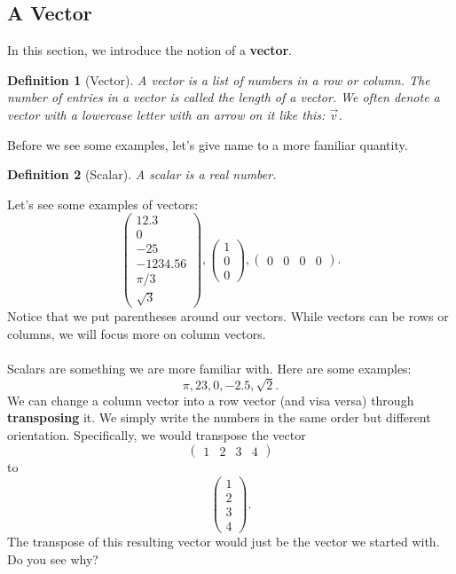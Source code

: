 \documentclass{article}
\newtheorem*{definition}{Definition}
\begin{document}
\subsection{A Vector}
In this section, we introduce the notion of a \textbf{vector}.
\begin{definition}[Vector]
A vector is a list of numbers in a row or column. The number of entries in a vector is called the length of a vector. We often denote a vector with a lowercase letter with an arrow on it like this: $\vec{v}$. 
\end{definition}
Before we see some examples, let's give name to a more familiar quantity.
\begin{definition}[Scalar]
A scalar is a real number. 
\end{definition}
Let's see some examples of vectors: 
\[
\begin{pmatrix}
12.3\\
0\\
-25\\
-1234.56\\
\pi/3\\
\sqrt{3}
\end{pmatrix},
\begin{pmatrix}
1\\
0\\
0
\end{pmatrix},
\begin{pmatrix}
0 & 0 & 0 & 0
\end{pmatrix}
.\]
Notice that we put parentheses around our vectors. While vectors can be rows or columns, we will focus more on column vectors. 
\\
\\
Scalars are something we are more familiar with. Here are some examples: \[\pi, 23, 0, -2.5, \sqrt{2}.\]
We can change a column vector into a row vector (and visa versa) through \textbf{transposing} it. We simply write the numbers in the same order but different orientation. Specifically, we would transpose the vector 
\[
\begin{pmatrix}
1 & 2 & 3 & 4
\end{pmatrix}
\]
to 
\[
\begin{pmatrix}
1\\
2\\
3\\
4
\end{pmatrix}.
\]
The transpose of this resulting vector would just be the vector we started with. Do you see why?
\\
\\
\end{document}
